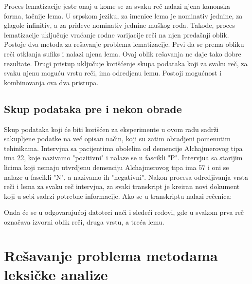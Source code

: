 \documentclass[12pt,oneside]{memoir}
\begin{document}
Proces lematizacije jeste onaj u kome se za svaku reč nalazi njena kanonska forma, tačnije lema. U srpskom jeziku,  za imenice lema je nominativ jednine,  za glagole infinitiv,  a za prideve nominativ jednine muškog roda. Takođe,  proces lematizacije uključuje vraćanje rodne varijacije reči na njen pređašnji oblik. 
Postoje dva metoda za rešavanje problema lematizacije.  Prvi da se prema obliku reči otklanja sufiks i nalazi njena lema.  Ovaj oblik rešavanja ne daje tako dobre rezultate.  Drugi pristup uključuje korišćenje skupa podataka koji za svaku reč,  za svaku njenu moguću vrstu reči,  ima odredjenu lemu.  Postoji mogućnost i kombinovanja ova dva pristupa. 

\section{Skup podataka pre i nekon obrade}

Skup podataka koji će biti korišćen za eksperimente u ovom radu sadrži sakupljene podatke na već opisan način,  koji su zatim obradjeni pomenutim tehinikama.  Intervjua sa pacijentima obolelim od demencije Alchajmerovog tipa ima 22,  koje nazivamo "pozitivni" i nalaze se u fascikli "P".  Intervjua sa starijim licima koji nemaju utvrdjenu demenciju Alchajmerovog tipa ima 57 i oni se nalaze u fascikli "N", a nazivamo ih "negativni".  Nakon procesa odredjivanja vrsta reči i lema za svaku reč intervjua,  za svaki transkript je kreiran novi dokument koji u sebi sadrzi potrebne informacije.  Ako se u transkriptu nalazi rečenica:
\newline

\noindent{}
\newline\newline
Onda će se u odgovarajućoj datoteci naći i sledeći redovi, gde u svakom prva reč označava izvorni oblik reči, druga vrstu, a treća lemu. 
\newline

\noindent{}

\chapter{Rešavanje problema metodama leksičke analize}
\end{document}
